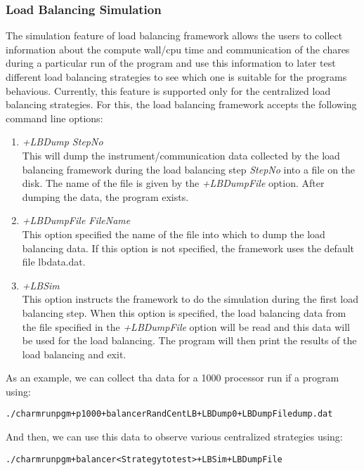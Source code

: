 \subsubsection{Load Balancing Simulation}
The simulation feature of load balancing framework allows the users to collect information
about the compute wall/cpu time and communication of the chares during a particular run of
the program and use this information to later test different load balancing strategies to
see which one is suitable for the programs behavious. Currently, this feature is supported only for
the centralized load balancing strategies. For this, the load balancing framework
accepts the following command line options:
\begin{enumerate}
\item {\em +LBDump StepNo}\\
      This will dump the instrument/communication data collected by the load balancing framework
	  during the load balancing step {\em StepNo} into a file on the disk. The name of the file
	  is given by the {\em +LBDumpFile} option. After dumping the data, the program exists.
\item {\em +LBDumpFile FileName}\\
	This option specified the name of the file into which to dump the load balancing data. If this
	option is not specified, the framework uses the default file lbdata.dat.
\item {\em +LBSim} \\
	This option instructs the framework to do the simulation during the first load balancing step.
	When this option is specified, the load balancing data from the file specified in the {\em +LBDumpFile}
	option will be read and this data will be used for the load balancing. The program will then print
	the results of the load balancing and exit.
\end{enumerate}
As an example, we can collect tha data for a 1000 processor run if a program using:
\begin{alltt}
./charmrun pgm +p 1000 +balancer RandCentLB +LBDump 0 +LBDumpFile dump.dat
\end{alltt}
And then, we can use this data to observe various centralized strategies using:
\begin{alltt}
./charmrun pgm +balancer <Strategy to test> +LBSim +LBDumpFile
\end{alltt}
